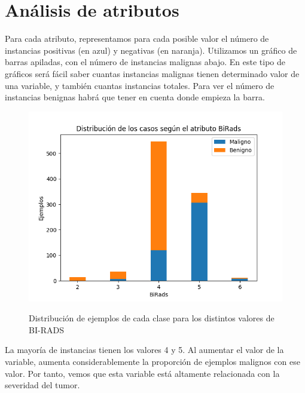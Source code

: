 \documentclass[oneside]{book}
\begin{document}
\newpage

\section{Análisis de atributos}

Para cada atributo, representamos para cada posible valor el número de
instancias positivas (en azul) y negativas (en naranja). Utilizamos un
gráfico de barras apiladas, con el número de instancias malignas
abajo. En este tipo de gráficos será fácil saber cuantas instancias
malignas tienen determinado valor de una variable, y también cuantas
instancias totales. Para ver el número de instancias benignas habrá
que tener en cuenta donde empieza la barra.

\begin{figure}[H]
  \centering
  \caption{Distribución de ejemplos de cada clase para los distintos valores de BI-RADS}
  \includegraphics[width=140mm]{figures/visualizacion/birads}
  \label{fig:birads}
\end{figure}

La mayoría de instancias tienen los valores 4 y 5. Al aumentar el
valor de la variable, aumenta considerablemente la proporción de
ejemplos malignos con ese valor. Por tanto, vemos que esta variable
está altamente relacionada con la severidad del tumor.
\end{document}

